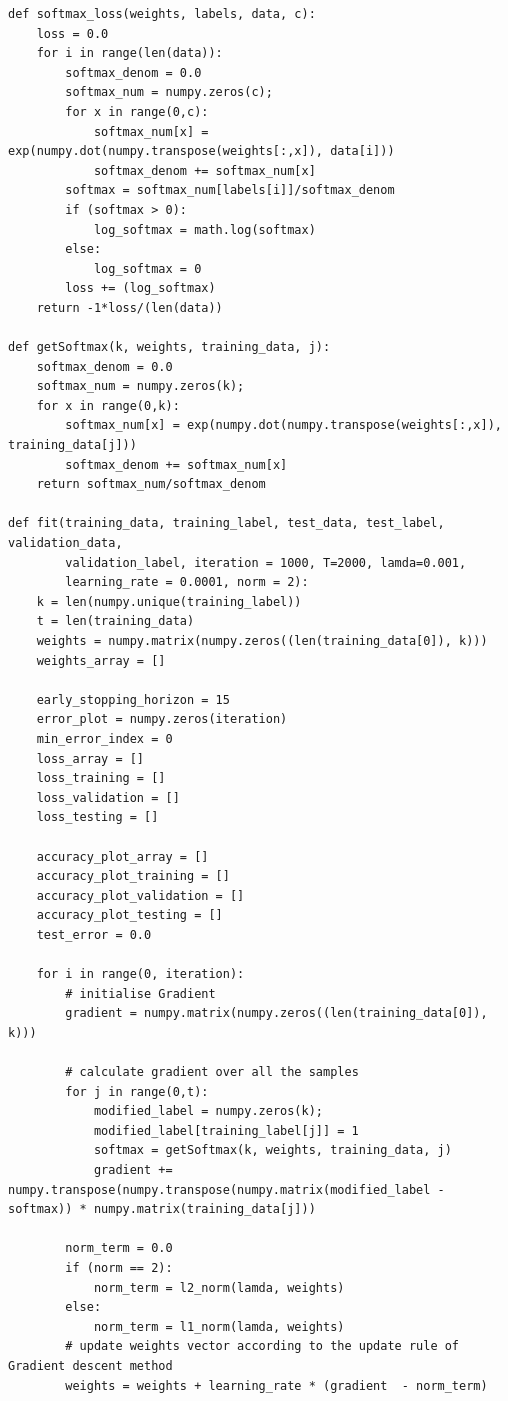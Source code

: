 \documentclass{article}
\begin{document}
\begin{lstlisting}
def softmax_loss(weights, labels, data, c):
    loss = 0.0
    for i in range(len(data)):    
        softmax_denom = 0.0
        softmax_num = numpy.zeros(c);
        for x in range(0,c):
            softmax_num[x] = exp(numpy.dot(numpy.transpose(weights[:,x]), data[i]))
            softmax_denom += softmax_num[x]
        softmax = softmax_num[labels[i]]/softmax_denom
        if (softmax > 0):
            log_softmax = math.log(softmax)
        else:
            log_softmax = 0
        loss += (log_softmax)
    return -1*loss/(len(data))
    
def getSoftmax(k, weights, training_data, j):
    softmax_denom = 0.0
    softmax_num = numpy.zeros(k);
    for x in range(0,k):
        softmax_num[x] = exp(numpy.dot(numpy.transpose(weights[:,x]), training_data[j]))
        softmax_denom += softmax_num[x]
    return softmax_num/softmax_denom

def fit(training_data, training_label, test_data, test_label, validation_data, 
        validation_label, iteration = 1000, T=2000, lamda=0.001, 
        learning_rate = 0.0001, norm = 2):
    k = len(numpy.unique(training_label))
    t = len(training_data)
    weights = numpy.matrix(numpy.zeros((len(training_data[0]), k)))
    weights_array = []
        
    early_stopping_horizon = 15    
    error_plot = numpy.zeros(iteration)
    min_error_index = 0
    loss_array = []
    loss_training = []
    loss_validation = []
    loss_testing = []
    
    accuracy_plot_array = []
    accuracy_plot_training = []
    accuracy_plot_validation = []
    accuracy_plot_testing = []    
    test_error = 0.0    
    
    for i in range(0, iteration):
        # initialise Gradient
        gradient = numpy.matrix(numpy.zeros((len(training_data[0]), k)))
        
        # calculate gradient over all the samples
        for j in range(0,t):
            modified_label = numpy.zeros(k);
            modified_label[training_label[j]] = 1
            softmax = getSoftmax(k, weights, training_data, j)
            gradient += numpy.transpose(numpy.transpose(numpy.matrix(modified_label - softmax)) * numpy.matrix(training_data[j]))
        
        norm_term = 0.0
        if (norm == 2):
            norm_term = l2_norm(lamda, weights)
        else:
            norm_term = l1_norm(lamda, weights)
        # update weights vector according to the update rule of Gradient descent method
        weights = weights + learning_rate * (gradient  - norm_term)
        

\end{lstlisting}
\end{document}
